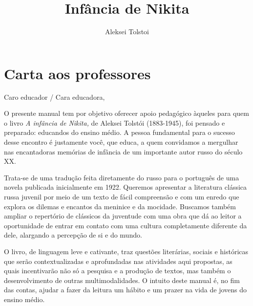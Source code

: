 \documentclass{article}
\begin{document}
\newcommand{\AutorLivro}{Aleksei Tolstoi}
\newcommand{\TituloLivro}{Infância de Nikita}
\newcommand{\Tema}{Ficção, mistério e fantasia}
\newcommand{\Genero}{Romance}
\newcommand{\issnppub}{---}
\newcommand{\issnepub}{---}
\newcommand{\colaborador}{\textbf{Marina Darmaros} é uma pessoa incrível e vai fazer um bom serviço.}


\title{\TituloLivro}
\author{\AutorLivro}
\def\authornotes{\colaborador}

\date{}
\maketitle
\tableofcontents

\pagebreak

\section{Carta aos professores}

Caro educador / Cara educadora,\\\bigskip

O presente manual tem por objetivo oferecer apoio pedagógico àqueles
para quem o livro \emph{A infância de Nikita,} de Aleksei Tolstói
(1883-1945), foi pensado e preparado: educandos do ensino médio. A
pessoa fundamental para o sucesso desse encontro é justamente você, que
educa, a quem convidamos a mergulhar nas encantadoras memórias de
infância de um importante autor russo do século XX.

Trata-se de uma tradução feita diretamente do russo para o português de
uma novela publicada inicialmente em 1922. Queremos apresentar a
literatura clássica russa juvenil por meio de um texto de fácil
compreensão e com um enredo que explora os dilemas e encantos da
meninice e da mocidade. Buscamos também ampliar o repertório de
clássicos da juventude com uma obra que dá ao leitor a oportunidade de
entrar em contato com uma cultura completamente diferente da dele,
alargando a percepção de si e do mundo.

O livro, de linguagem leve e cativante, traz questões literárias,
sociais e históricas que serão contextualizadas e aprofundadas nas
atividades aqui propostas, as quais incentivarão não só a pesquisa e a
produção de textos, mas também o desenvolvimento de outras
multimodalidades. O intuito deste manual é, no fim das contas, ajudar a
fazer da leitura um hábito e um prazer na vida de jovens do ensino
médio.
\end{document}
